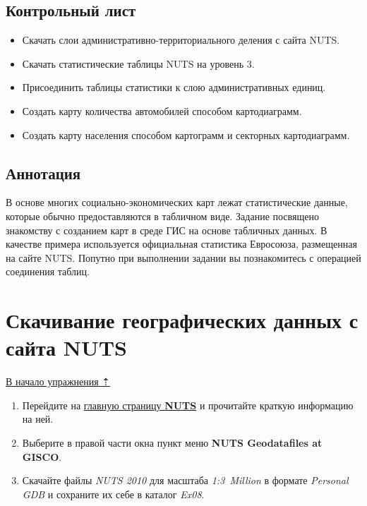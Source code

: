 \documentclass[]{book}
\providecommand{\tightlist}{%
  \setlength{\itemsep}{0pt}\setlength{\parskip}{0pt}}
\theoremstyle{definition}
\theoremstyle{definition}
\theoremstyle{definition}
\theoremstyle{remark}
\begin{document}
\hypertarget{stat-map-economic-control}{%
\subsection{Контрольный лист}\label{stat-map-economic-control}}

\begin{itemize}
\tightlist
\item
  Скачать слои административно-территориального деления с сайта NUTS.
\item
  Скачать статистические таблицы NUTS на уровень 3.
\item
  Присоединить таблицы статистики к слою административных единиц.
\item
  Создать карту количества автомобилей способом картодиаграмм.
\item
  Создать карту населения способом картограмм и секторных картодиаграмм.
\end{itemize}

\hypertarget{stat-map-economic-annotation}{%
\subsection{Аннотация}\label{stat-map-economic-annotation}}

В основе многих социально-экономических карт лежат статистические
данные, которые обычно предоставляются в табличном виде. Задание
посвящено знакомству с созданием карт в среде ГИС на основе табличных
данных. В качестве примера используется официальная статистика
Евросоюза, размещенная на сайте NUTS. Попутно при выполнении задании вы
познакомитесь с операцией соединения таблиц.

\hypertarget{stat-map-economic-nuts-geo}{%
\section{Скачивание географических данных с сайта
NUTS}\label{stat-map-economic-nuts-geo}}

\protect\hyperlink{stat-map-economic}{В начало упражнения ⇡}

\begin{enumerate}
\def\labelenumi{\arabic{enumi}.}
\item
  Перейдите на
  \href{http://epp.eurostat.ec.europa.eu/portal/page/portal/nuts_nomenclature/introduction}{главную
  страницу \textbf{NUTS}} и прочитайте краткую информацию на ней.
\item
  Выберите в правой части окна пункт меню \textbf{NUTS Geodatafiles at
  GISCO}.
\item
  Скачайте файлы \emph{NUTS 2010} для масштаба \emph{1:3~Million} в
  формате \emph{Personal GDB} и сохраните их себе в каталог \emph{Ex08}.
\end{enumerate}
\end{document}

